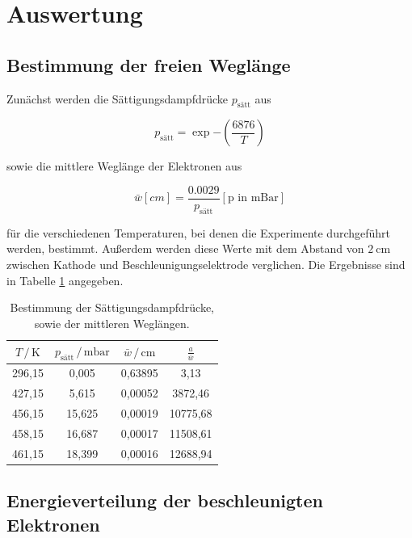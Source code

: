 \section{Auswertung}
\label{sec:Auswertung}

\subsection{Bestimmung der freien Weglänge}

Zunächst werden die Sättigungsdampfdrücke $p_\text{sätt}$ aus

\begin{equation*}
p_\text{sätt} = \exp{-\left(\frac{6876}{T}\right)}
\end{equation*}

sowie die mittlere Weglänge der Elektronen aus 

\begin{equation*}
\bar{w}[cm] = \frac{\num{0.0029}}{p_\text{sätt}}[\text{p in mBar}]
\end{equation*}

für die verschiedenen Temperaturen, bei denen die Experimente durchgeführt
werden, bestimmt. Außerdem werden diese Werte mit dem Abstand von $\SI{2}{\centi\meter}$ zwischen Kathode
und Beschleunigungselektrode verglichen. Die Ergebnisse sind in Tabelle \ref{tab:weg} angegeben. 

\begin{table}
  \centering
  \caption{Bestimmung der Sättigungsdampfdrücke, sowie der mittleren Weglängen.}
  \label{tab:weg}
  \begin{tabular}{c c c c}
  \toprule
  $ T \,/\, \si{\kelvin} $ & $ p_\text{sätt} \,/\, \si{\milli\bar} $ & $\bar{w} \,/\, \si{\centi\meter}$ & $\frac{a}{\bar{w}}$\\
  \midrule 
  296,15 &  0,005 & 0,63895 &     3,13\\
  427,15 &  5,615 & 0,00052 &  3872,46\\
  456,15 & 15,625 & 0,00019 & 10775,68\\
  458,15 & 16,687 & 0,00017 & 11508,61\\
  461,15 & 18,399 & 0,00016 & 12688,94\\
  \bottomrule
  \end{tabular}
  \end{table}

\subsection{Energieverteilung der beschleunigten Elektronen}

